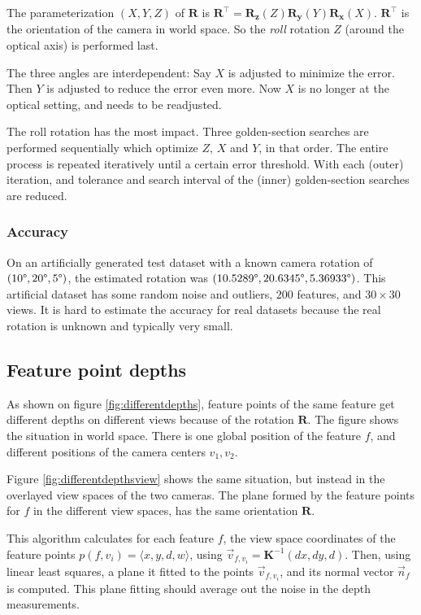 \documentclass{scrreprt}
\newcommand{\matr}[1]{\mathbf{#1}}
\newcommand{\transpose}[1]{#1^\intercal}
\newcommand{\degr}{\text{\textdegree}}
\begin{document}
The parameterization $(X,Y,Z)$ of $\matr{R}$ is $\transpose{\matr{R}} = \matr{R_z}(Z) \matr{R_y}(Y) \matr{R_x}(X)$. $\transpose{\matr{R}}$ is the orientation of the camera in world space. So the \emph{roll} rotation $Z$ (around the optical axis) is performed last.

The three angles are interdependent: Say $X$ is adjusted to minimize the error. Then $Y$ is adjusted to reduce the error even more. Now $X$ is no longer at the optical setting, and needs to be readjusted.

The roll rotation has the most impact. Three golden-section searches are performed sequentially which optimize $Z$, $X$ and $Y$, in that order. The entire process is repeated iteratively until a certain error threshold. With each (outer) iteration, and tolerance and search interval of the (inner) golden-section searches are reduced.

\subsubsection{Accuracy}
On an artificially generated test dataset with a known camera rotation of $(10\degr, 20\degr, 5\degr)$, the estimated rotation was $(10.5289\degr, 20.6345\degr, 5.36933\degr)$. This artificial dataset has some random noise and outliers, $200$ features, and $30 \times 30$ views. It is hard to estimate the accuracy for real datasets because the real rotation is unknown and typically very small.

\pagebreak

\subsection{Feature point depths}
\label{sec:depthrot}
As shown on figure \ref{fig:differentdepths}, feature points of the same feature get different depths on different views because of the rotation $\matr{R}$. The figure shows the situation in world space. There is one global position of the feature $f$, and different positions of the camera centers $v_1, v_2$.

Figure \ref{fig:differentdepthsview} shows the same situation, but instead in the overlayed view spaces of the two cameras. The plane formed by the feature points for $f$ in the different view spaces, has the same orientation $\matr{R}$.

This algorithm calculates for each feature $f$, the view space coordinates of the feature points $p(f,v_i) = \langle x,y,d,w\rangle$, using $\vec{v}_{f,v_i} = \matr{K}^{-1} (d x, d y, d)$. Then, using linear least squares, a plane it fitted to the points $\vec{v}_{f,v_i}$, and its normal vector $\vec{n}_f$ is computed. This plane fitting should average out the noise in the depth measurements.
\end{document}
